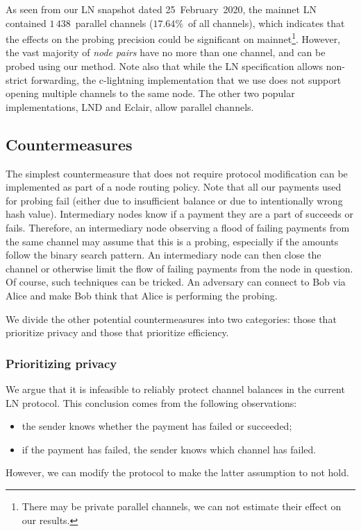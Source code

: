 As seen from our LN snapshot dated 25~February~2020, the mainnet LN contained $1\,438$~parallel channels ($17.64\%$~of all channels), which indicates that the effects on the probing precision could be significant on mainnet\footnote{There may be private parallel channels, we can not estimate their effect on our results.}.
However, the vast majority of \textit{node pairs} have no more than one channel, and can be probed using our method.
Note also that while the LN specification allows non-strict forwarding, the c-lightning implementation that we use does not support opening multiple channels to the same node.
The other two popular implementations, LND and Eclair, allow parallel channels.




\subsection{Countermeasures}

The simplest countermeasure that does not require protocol modification can be implemented as part of a node routing policy.
Note that all our payments used for probing fail (either due to insufficient balance or due to intentionally wrong hash value). 
Intermediary nodes know if a payment they are a part of succeeds or fails.
Therefore, an intermediary node observing a flood of failing payments from the same channel may assume that this is a probing, especially if the amounts follow the binary search pattern.
An intermediary node can then close the channel or otherwise limit the flow of failing payments from the node in question.
Of course, such techniques can be tricked.
An adversary can connect to Bob via Alice and make Bob think that Alice is performing the probing.

We divide the other potential countermeasures into two categories: those that prioritize privacy and those that prioritize efficiency.


\subsubsection*{Prioritizing privacy}

We argue that it is infeasible to reliably protect channel balances in the current LN protocol.
This conclusion comes from the following observations:
\begin{itemize}
	\item the sender knows whether the payment has failed or succeeded;
	\item if the payment has failed, the sender knows which channel has failed.
\end{itemize}
However, we can modify the protocol to make the latter assumption to not hold.

